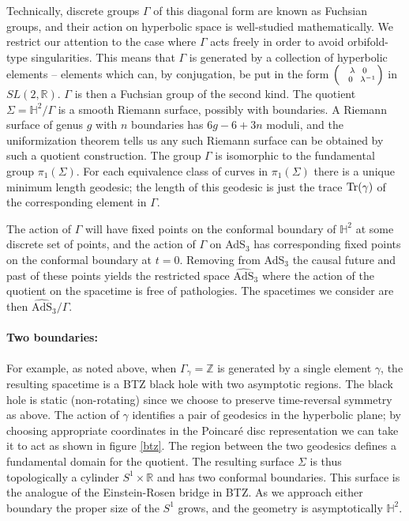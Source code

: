 \documentclass[12pt]{article}
\newcommand{\RR}{\mathbb{R}} %
\newcommand{\ZZ}{\mathbb{Z}} %
\newcommand{\HH}{\mathbb{H}}
\newcommand{\Tr}{{\rm {Tr}}}
\def\Tr{{\rm Tr}}
\numberwithin{equation}{section}
\begin{document}
Technically, discrete groups $\Gamma$ of this diagonal form are known as Fuchsian groups, and their action on hyperbolic space is well-studied mathematically.  We restrict our attention to the case where $\Gamma$ acts freely in order to avoid orbifold-type singularities.  This means that  $\Gamma$ is generated by a collection of hyperbolic elements -- elements which can, by conjugation, be put in the form $\left({\lambda~~0\atop~~0~~\lambda^{-1}}\right)$ in $SL(2,\RR)$. $\Gamma$ is then a Fuchsian group of the second kind. The quotient $\Sigma = \HH^2/\Gamma$ is a smooth Riemann surface, possibly with boundaries. A Riemann surface of genus $g$ with $n$ boundaries has $6g - 6 + 3n$ moduli, and the uniformization theorem tells us any such Riemann surface can be obtained by such a quotient construction. The group $\Gamma$ is isomorphic to the fundamental group $\pi_1(\Sigma)$. For each equivalence class of curves in $\pi_1(\Sigma)$ there is a unique minimum length geodesic; the length of this geodesic is just the trace $\Tr (\gamma)$ of the corresponding element in $\Gamma$.

The action of $\Gamma$ will have fixed points on the conformal boundary of $\HH^2$ at some discrete set of points, and the action of $\Gamma$ on AdS${}_3$ has corresponding fixed points on the conformal boundary at $t=0$. Removing from AdS$_3$ the causal future and past of these points yields the restricted space  $\widehat{\mathrm{AdS}}_3$ where the action of the quotient on the spacetime is free of pathologies. The spacetimes we consider are then $\widehat{\mathrm{AdS}}_3 / \Gamma$.




\paragraph{Two boundaries:} For example, as noted above, when $\Gamma_\gamma =\ZZ$ is generated by a single element $\gamma$, the resulting spacetime is a BTZ black hole with two asymptotic regions.  The black hole is static (non-rotating) since we choose to preserve time-reversal symmetry as above.  The action of $\gamma$ identifies a pair of geodesics in the hyperbolic plane; by choosing appropriate coordinates in the Poincar\'e disc representation we can take it to act as shown in figure \ref{btz}. The region between the two geodesics defines a fundamental domain for the quotient.  The resulting surface $\Sigma$ is thus topologically a cylinder $S^1 \times \mathbb{R}$ and has two conformal boundaries. This surface is the analogue of the Einstein-Rosen bridge in BTZ. As we approach either boundary the proper size of the $S^1$ grows, and the geometry is asymptotically $\HH^2$.
\end{document}
